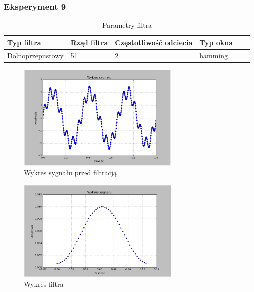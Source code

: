 \documentclass{article}
\begin{document}
{        \subsubsection{Eksperyment 9} {
            \begin{table}[h!]
            \centering
            \begin{tabular}{|l|l|l|l|l|l|}
            \hline
            Typ filtra & Rząd filtra & Częstotliwość odciecia & Typ okna  \\\hline
            Dolnoprzepustowy & 51 & 2 & hamming     \\\hline
            \end{tabular}
            \caption{Parametry filtra}
            \end{table}
            \begin{figure}[h!]
                \centering
                \includegraphics[width=0.7\textwidth]{img/sig.png}
                \caption{Wykres sygnału przed filtracją}
            \end{figure}
            \begin{figure}[h!]
                \centering
                \includegraphics[width=0.7\textwidth]{img/fil17.png}
                \caption{Wykres filtra}
            \end{figure}

}}
\end{document}
